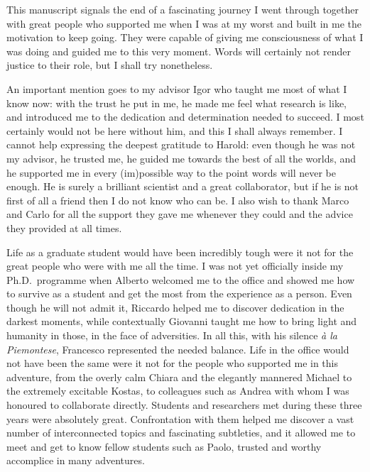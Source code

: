 This manuscript signals the end of a fascinating journey I went through together with great people who supported me when I was at my worst and built in me the motivation to keep going.
They were capable of giving me consciousness of what I was doing and guided me to this very moment.
Words will certainly not render justice to their role, but I shall try nonetheless.

An important mention goes to my advisor Igor who taught me most of what I know now: with the trust he put in me, he made me feel what research is like, and introduced me to the dedication and determination needed to succeed.
I most certainly would not be here without him, and this I shall always remember.
I cannot help expressing the deepest gratitude to Harold: even though he was not my advisor, he trusted me, he guided me towards the best of all the worlds, and he supported me in every (im)possible way to the point words will never be enough.
He is surely a brilliant scientist and a great collaborator, but if he is not first of all a friend then I do not know who can be.
I also wish to thank Marco and Carlo for all the support they gave me whenever they could and the advice they provided at all times.

Life as a graduate student would have been incredibly tough were it not for the great people who were with me all the time.
I was not yet officially inside my Ph.D.\ programme when Alberto welcomed me to the office and showed me how to survive as a student and get the most from the experience as a person.
Even though he will not admit it, Riccardo helped me to discover dedication in the darkest moments, while contextually Giovanni taught me how to bring light and humanity in those, in the face of adversities.
In all this, with his silence \emph{à la Piemontese}, Francesco represented the needed balance.
Life in the office would not have been the same were it not for the people who supported me in this adventure, from the overly calm Chiara and the elegantly mannered Michael to the extremely excitable Kostas, to colleagues such as Andrea with whom I was honoured to collaborate directly.
Students and researchers met during these three years were absolutely great.
Confrontation with them helped me discover a vast number of interconnected topics and fascinating subtleties, and it allowed me to meet and get to know fellow students such as Paolo, trusted and worthy accomplice in many adventures.

